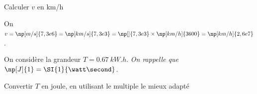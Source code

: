 


\begin{enonce}
Calculer $v$ en km/h
\end{enonce}


\begin{corrige}
On $v = \np[m/s]{7,3e6} = \np[km/s]{7,3e3} = \np[]{7,3e3} \times \np[km/h]{3600} = \np[km/h]{2,6e7}$. 
\end{corrige}



\finEntrainement









\hauteurLargeurCadreReponse		{8mm}{3cm}
\initialisationEntrainement

On considère la grandeur $T=\SI{0,67}{kW.h}$. {\itshape On rappelle que $\np[J]{1} = \SI{1}{\watt \second}$.}

\debutEntrainement


\begin{enonce}
Convertir $T$ en joule, en utilisant le multiple le mieux adapté
\end{enonce}

